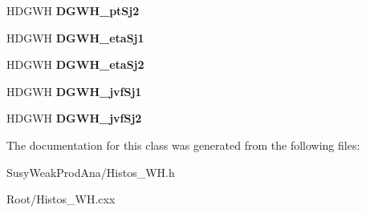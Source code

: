 \begin{DoxyCompactItemize}
\item 
\hypertarget{classHistos__WH_ab579a15ab0bd413c5028898cece44deb}{
HDGWH {\bfseries DGWH\_\-ptSj2}}
\label{classHistos__WH_ab579a15ab0bd413c5028898cece44deb}

\item 
\hypertarget{classHistos__WH_a105be6a5e44eb05d6b5f2d4e8de60746}{
HDGWH {\bfseries DGWH\_\-etaSj1}}
\label{classHistos__WH_a105be6a5e44eb05d6b5f2d4e8de60746}

\item 
\hypertarget{classHistos__WH_a83809a93b7013e372601f0802f174c62}{
HDGWH {\bfseries DGWH\_\-etaSj2}}
\label{classHistos__WH_a83809a93b7013e372601f0802f174c62}

\item 
\hypertarget{classHistos__WH_afc3ba7412dbfa6e177a1f0293a690180}{
HDGWH {\bfseries DGWH\_\-jvfSj1}}
\label{classHistos__WH_afc3ba7412dbfa6e177a1f0293a690180}

\item 
\hypertarget{classHistos__WH_a4d14deed8b028f30728c26f7a1786ee1}{
HDGWH {\bfseries DGWH\_\-jvfSj2}}
\label{classHistos__WH_a4d14deed8b028f30728c26f7a1786ee1}

\end{DoxyCompactItemize}


The documentation for this class was generated from the following files:\begin{DoxyCompactItemize}
\item 
SusyWeakProdAna/Histos\_\-WH.h\item 
Root/Histos\_\-WH.cxx\end{DoxyCompactItemize}
